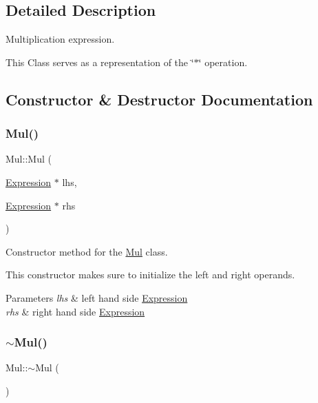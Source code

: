 \subsection{Detailed Description}
Multiplication expression. 

This Class serves as a representation of the \char`\"{}$\ast$\char`\"{} operation. 

\subsection{Constructor \& Destructor Documentation}
\mbox{\label{class_mul_af8f36e90eda7ce256bd1e93635d55750}} 
\subsubsection{\texorpdfstring{Mul()}{Mul()}}
{\footnotesize\ttfamily Mul\+::\+Mul (\begin{DoxyParamCaption}\item[{\hyperlink{class_expression}{Expression} $\ast$}]{lhs,  }\item[{\hyperlink{class_expression}{Expression} $\ast$}]{rhs }\end{DoxyParamCaption})}



Constructor method for the \hyperlink{class_mul}{Mul} class. 

This constructor makes sure to initialize the left and right operands.


\begin{DoxyParams}{Parameters}
{\em lhs} & left hand side \hyperlink{class_expression}{Expression} \\
\hline
{\em rhs} & right hand side \hyperlink{class_expression}{Expression} \\
\hline
\end{DoxyParams}
\mbox{\label{class_mul_ad072b4a8fa7c2c7acb794454d3b97c8c}} 
\subsubsection{\texorpdfstring{$\sim$\+Mul()}{~Mul()}}
{\footnotesize\ttfamily Mul\+::$\sim$\+Mul (\begin{DoxyParamCaption}{ }\end{DoxyParamCaption})}




